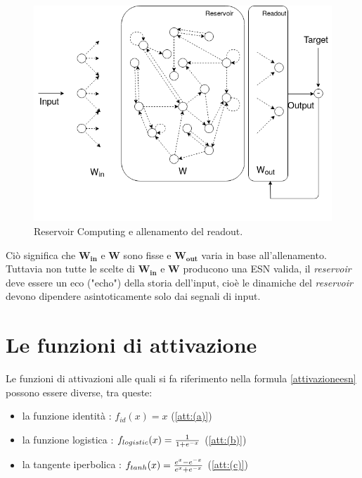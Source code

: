 \begin{figure}[h!]
	\centering 
	\includegraphics[width=0.7\linewidth]{immagini/RC.png}
	\caption{Reservoir Computing e allenamento del readout.}
	\label{fig:RC}
\end{figure}

Ciò significa che $\mathbf{\mathbf{W_{in}}}$ e $\mathbf{\mathbf{W}}$ sono fisse e $\mathbf{\mathbf{W_{out}}}$ varia in base all'allenamento. Tuttavia non tutte le scelte di $\mathbf{\mathbf{W_{in}}}$ e $\mathbf{\mathbf{W}}$ producono una ESN valida, il \textit{reservoir} deve essere un eco ("echo") della storia dell'input, cioè le dinamiche del \textit{reservoir} devono dipendere asintoticamente solo dai segnali di input.


\section{Le funzioni di attivazione}
Le funzioni di attivazioni alle quali si fa riferimento nella formula \ref{attivazioneesn} possono essere diverse, tra queste:
\begin{itemize}
	\item la funzione identità : $f_{id}(x)=x$ (\ref{att:(a)})
	\item la funzione logistica : $f_{logistic}(x)=  {1 \over 1+ e^{-x} }$ (\ref{att:(b)})
	\item la tangente iperbolica : $f_{tanh}(x)=  {e^{x}- e^{-x} \over e^{x}+ e^{-x} }$ (\ref{att:(c)})
\end{itemize}

